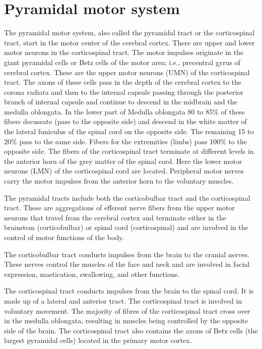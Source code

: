 \hypertarget{pyramidal-motor-system}{%
\section{Pyramidal motor system}\label{pyramidal-motor-system}}

The pyramidal motor system, also called the pyramidal tract or the corticospinal tract, start in the motor center of the cerebral cortex. There are upper and lower motor neurons in the corticospinal tract. The motor impulses originate in the giant pyramidal cells or Betz cells of the motor area; i.e., precentral gyrus of cerebral cortex. These are the upper motor neurons (UMN) of the corticospinal tract. The axons of these cells pass in the depth of the cerebral cortex to the corona radiata and then to the internal capsule passing through the posterior branch of internal capsule and continue to descend in the midbrain and the medulla oblongata. In the lower part of Medulla oblongata 80 to 85\% of these fibers decussate (pass to the opposite side) and descend in the white matter of the lateral funiculus of the spinal cord on the opposite side. The remaining 15 to 20\% pass to the same side. Fibers for the extremities (limbs) pass 100\% to the opposite side. The fibers of the corticospinal tract terminate at different levels in the anterior horn of the grey matter of the spinal cord. Here the lower motor neurons (LMN) of the corticospinal cord are located. Peripheral motor nerves carry the motor impulses from the anterior horn to the voluntary muscles.

The pyramidal tracts include both the corticobulbar tract and the corticospinal tract. These are aggregations of efferent nerve fibers from the upper motor neurons that travel from the cerebral cortex and terminate either in the brainstem (corticobulbar) or spinal cord (corticospinal) and are involved in the control of motor functions of the body.

The corticobulbar tract conducts impulses from the brain to the cranial nerves. These nerves control the muscles of the face and neck and are involved in facial expression, mastication, swallowing, and other functions.

The corticospinal tract conducts impulses from the brain to the spinal cord. It is made up of a lateral and anterior tract. The corticospinal tract is involved in voluntary movement. The majority of fibres of the corticospinal tract cross over in the medulla oblongata, resulting in muscles being controlled by the opposite side of the brain. The corticospinal tract also contains the axons of Betz cells (the largest pyramidal cells) located in the primary motor cortex.

